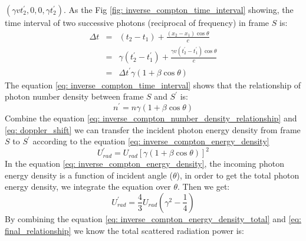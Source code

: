 \documentclass[12pt]{report}
\begin{document}
          $\left(\gamma v t_{2}^{\prime}, 0, 0, \gamma t_{2}^{\prime}\right)$. 
          As the Fig \ref{fig: inverse_compton_time_interval} showing, the time interval of two successive 
          photons (reciprocal of frequency) in frame $S$ is: 
          \begin{eqnarray}
            \label{eq: inverse_compton_time_interval}
            \Delta t &=& \left(t_2 - t_1\right) + \frac{\left(x_2 - x_1\right) \cos{\theta}}{c}  \nonumber \\
                     &=& \gamma \left(t_{2}^{\prime} - t_{1}^{\prime}\right) + \frac{\gamma v \left(t_{2}^{\prime} - t_{1}^{\prime}\right) \cos{\theta}}{c} \nonumber \\
                     &=&  \Delta t^{\prime} \gamma \left(1 + \beta \cos{\theta}\right) 
          \end{eqnarray}
          The equation \ref{eq: inverse_compton_time_interval} shows that the relationship of photon number 
          density between frame $S$ and $S^{\prime}$ is:
          \begin{equation}
            \label{eq: inverse_compton_number_density_relationship}
            n^{\prime} = n \gamma \left(1 + \beta \cos{\theta}\right) 
          \end{equation}
          Combine the equation \ref{eq: inverse_compton_number_density_relationship} and 
          \ref{eq: doppler_shift} we can transfer the incident photon energy density from frame $S$ to 
          $S^{\prime}$ according to the equation \ref{eq: inverse_compton_energy_density}
          \begin{equation}
            \label{eq: inverse_compton_energy_density}
            U_{rad}^{\prime} = U_{rad} \left[\gamma \left(1 + \beta \cos{\theta}\right)\right]^{2}
          \end{equation}
          In the equation \ref{eq: inverse_compton_energy_density}, the incoming photon energy density 
          is a function of incident angle ($\theta$), in order to get the total photon energy density,
          we integrate the equation over $\theta$. Then we get: 
          \begin{equation}
            \label{eq: inverse_compton_energy_density_total}
            U_{rad}^{\prime} = \frac{4}{3} U_{rad} \left(\gamma^2 - \frac{1}{4}\right)
          \end{equation}
          By combining the equation \ref{eq: inverse_compton_energy_density_total} and 
          \ref{eq: final_relationship} we know the total scattered radiation power is:
\end{document}
